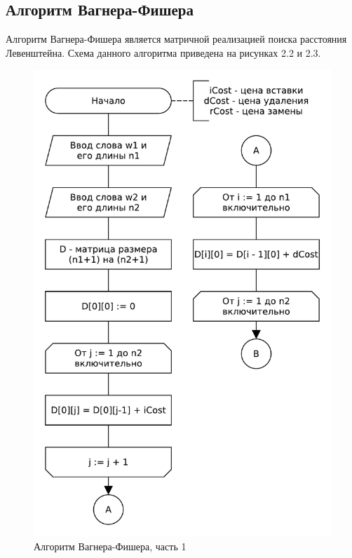 \subsection{Алгоритм Вагнера-Фишера}
Алгоритм Вагнера-Фишера является матричной реализацией поиска расстояния Левенштейна. Схема данного алгоритма приведена на рисунках 2.2 и 2.3.
\begin{figure}[H]
    \centering
    \includegraphics[scale=0.75]{pdf/wagner-fischer-part1.pdf}
    \caption{Алгоритм Вагнера-Фишера, часть 1}
\end{figure}
